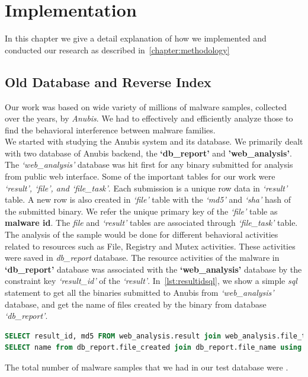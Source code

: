 \chapter{Implementation}\label{chapter:implementation}
In this chapter we give a detail explanation of how we implemented and conducted our research as described in~\autoref{chapter:methodology}
\section{Old Database and Reverse Index}
Our work was based on wide variety of millions of malware samples, collected over the years, by \emph{Anubis}.
We had to effectively and efficiently analyze those to find the behavioral interference between malware families.\\
We started with studying the Anubis system and its database.
We primarily dealt with two database of Anubis backend, the \textbf{`db\_report'} and \textbf{'web\_analysis'}.
The \emph{`web\_analysis'} database was hit first for any binary submitted for analysis from public web interface.
Some of the important tables for our work were \emph{`result', `file', and `file\_task'}.
Each submission is a unique row data in \emph{`result'} table.
A new row is also created in \emph{`file'} table with the \emph{`md5'} and \emph{`sha'} hash of the submitted binary.
We refer the unique primary key of the \emph{`file'} table as \textbf{malware id}.
The \emph{file} and \emph{`result'} tables are associated through \emph{`file\_task'} table.
The analysis of the sample would be done for different behavioral activities related to resources such as File, Registry and Mutex activities.
These activities were saved in \emph{db\_report} database.
The resource activities of the malware in \textbf{`db\_report'} database was associated with the \textbf{`web\_analysis'} database by the constraint key \textit{`result\_id'} of the \emph{`result'}.
In~\autoref{lst:resultidsql}, we show a simple \emph{sql} statement to get all the binaries submitted to Anubis from \emph{`web\_analysis'} database, and get the name of files created by the binary from database \emph{`db\_report'}.
\begin{lstlisting}[language=sql,caption={sql showing database structure to get file created activities of a malware sample},label={lst:resultidsql}]
SELECT result_id, md5 FROM web_analysis.result join web_analysis.file_task using (task_id) join web_analysis.file using (file_id) WHERE task_id = result_id;
SELECT name from db_report.file_created join db_report.file_name using (file_name_id) where result_id = '12345';
\end{lstlisting}
The total number of malware samples that we had in our test database were \textbf{\gettotalmalwarei{}}.\\

